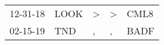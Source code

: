 \begin{supertabular}{p{0.07\textwidth}p{0.06\textwidth}p{0.02\textwidth}p{0.02\textwidth}p{0.06\textwidth}}
 12-31-18\textsuperscript{} &  LOOK\textsuperscript{} &  \textgreater &  \textgreater &  CML8\textsuperscript{} \\
 02-15-19\textsuperscript{} &   TND\textsuperscript{} &             , &             , &  BADF\textsuperscript{} \\
\end{supertabular}
